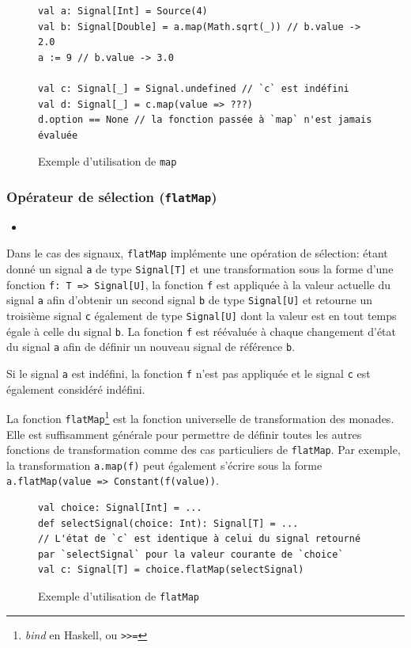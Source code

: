 \begin{figure}[h]
	\begin{lstlisting}
val a: Signal[Int] = Source(4)
val b: Signal[Double] = a.map(Math.sqrt(_)) // b.value -> 2.0
a := 9 // b.value -> 3.0

val c: Signal[_] = Signal.undefined // `c` est indéfini
val d: Signal[_] = c.map(value => ???)
d.option == None // la fonction passée à `map` n'est jamais évaluée
	\end{lstlisting}
	\caption{Exemple d'utilisation de \texttt{map}}
\end{figure}

\subsubsection{Opérateur de sélection (\texttt{flatMap})}

\begin{itemize}
	\item {}
\end{itemize}

Dans le cas des signaux, \texttt{flatMap} implémente une opération de sélection: étant donné un signal \texttt{a} de type \texttt{Signal[T]} et une transformation sous la forme d'une fonction \texttt{f: T => Signal[U]}, la fonction \texttt{f} est appliquée à la valeur actuelle du signal \texttt{a} afin d'obtenir un second signal \texttt{b} de type \texttt{Signal[U]} et retourne un troisième signal \texttt{c} également de type \texttt{Signal[U]} dont la valeur est en tout temps égale à celle du signal \texttt{b}. La fonction \texttt{f} est réévaluée à chaque changement d'état du signal \texttt{a} afin de définir un nouveau signal de référence \texttt{b}.

Si le signal \texttt{a} est indéfini, la fonction \texttt{f} n'est pas appliquée et le signal \texttt{c} est également considéré indéfini.

La fonction \texttt{flatMap}\footnote{\emph{bind} en Haskell, ou \texttt{>>=}} est la fonction universelle de transformation des monades. Elle est suffisamment générale pour permettre de définir toutes les autres fonctions de transformation comme des cas particuliers de \texttt{flatMap}. Par exemple, la transformation \texttt{a.map(f)} peut également s'écrire  sous la forme \texttt{a.flatMap(value => Constant(f(value))}.

\begin{figure}[h]
	\begin{lstlisting}
val choice: Signal[Int] = ...
def selectSignal(choice: Int): Signal[T] = ...
// L'état de `c` est identique à celui du signal retourné par `selectSignal` pour la valeur courante de `choice`
val c: Signal[T] = choice.flatMap(selectSignal)
	\end{lstlisting}
	\caption{Exemple d'utilisation de \texttt{flatMap}}
\end{figure}

